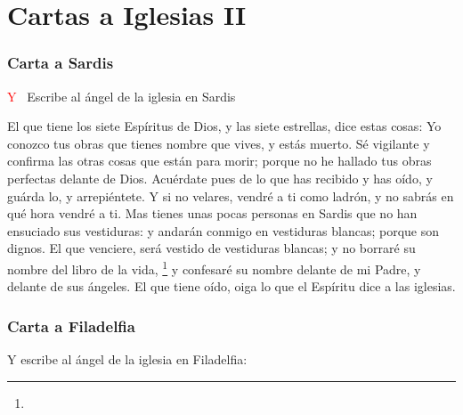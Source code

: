 \chapter{Cartas a Iglesias II}
\subsection*{Carta a Sardis}
\lettrine[lines=3]{\textcolor{red}{Y}}{\ } Escribe al ángel de la iglesia en Sardis

\zz El que tiene los siete Espíritus de Dios, y las siete estrellas, dice estas cosas: Yo conozco tus obras que tienes nombre que vives, y estás muerto. %
Sé vigilante y confirma las otras cosas que están para morir; porque no he hallado tus obras perfectas delante de Dios. %
Acuérdate pues de lo que has recibido y has oído, y guárda lo, y arrepiéntete. Y si no velares, vendré a ti como ladrón, y no sabrás en qué hora vendré a ti. %
Mas tienes unas pocas personas en Sardis que no han ensuciado sus vestiduras: y andarán conmigo en vestiduras blancas; porque son dignos. %
El que venciere, será vestido de vestiduras blancas; y no borraré su nombre del libro de la vida,%
	\footnote{ %
			}
 y confesaré su nombre delante de mi Padre, y delante de sus ángeles. %
El que tiene oído, oiga lo que el Espíritu dice a las iglesias.
\subsection*{Carta a Filadelfia}
Y escribe al ángel de la iglesia en Filadelfia:

